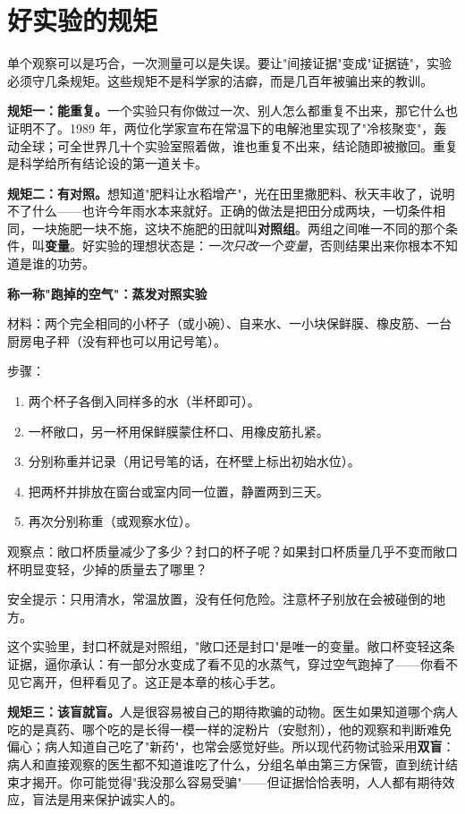 \section{好实验的规矩}

单个观察可以是巧合，一次测量可以是失误。要让"间接证据"变成"证据链"，实验必须守几条规矩。这些规矩不是科学家的洁癖，而是几百年被骗出来的教训。

\textbf{规矩一：能重复。}一个实验只有你做过一次、别人怎么都重复不出来，那它什么也证明不了。1989 年，两位化学家宣布在常温下的电解池里实现了"冷核聚变"，轰动全球；可全世界几十个实验室照着做，谁也重复不出来，结论随即被撤回。重复是科学给所有结论设的第一道关卡。

\textbf{规矩二：有对照。}想知道"肥料让水稻增产"，光在田里撒肥料、秋天丰收了，说明不了什么——也许今年雨水本来就好。正确的做法是把田分成两块，一切条件相同，一块施肥一块不施，这块不施肥的田就叫\textbf{对照组}。两组之间唯一不同的那个条件，叫\textbf{变量}。好实验的理想状态是：\emph{一次只改一个变量}，否则结果出来你根本不知道是谁的功劳。

\begin{shiyan}
\textbf{称一称"跑掉的空气"：蒸发对照实验}

材料：两个完全相同的小杯子（或小碗）、自来水、一小块保鲜膜、橡皮筋、一台厨房电子秤（没有秤也可以用记号笔）。

步骤：
\begin{enumerate}[itemsep=1pt]
\item 两个杯子各倒入同样多的水（半杯即可）。
\item 一杯敞口，另一杯用保鲜膜蒙住杯口、用橡皮筋扎紧。
\item 分别称重并记录（用记号笔的话，在杯壁上标出初始水位）。
\item 把两杯并排放在窗台或室内同一位置，静置两到三天。
\item 再次分别称重（或观察水位）。
\end{enumerate}

观察点：敞口杯质量减少了多少？封口的杯子呢？如果封口杯质量几乎不变而敞口杯明显变轻，少掉的质量去了哪里？

安全提示：只用清水，常温放置，没有任何危险。注意杯子别放在会被碰倒的地方。

这个实验里，封口杯就是对照组，"敞口还是封口"是唯一的变量。敞口杯变轻这条证据，逼你承认：有一部分水变成了看不见的水蒸气，穿过空气跑掉了——你看不见它离开，但秤看见了。这正是本章的核心手艺。
\end{shiyan}

\textbf{规矩三：该盲就盲。}人是很容易被自己的期待欺骗的动物。医生如果知道哪个病人吃的是真药、哪个吃的是长得一模一样的淀粉片（安慰剂），他的观察和判断难免偏心；病人知道自己吃了"新药"，也常会感觉好些。所以现代药物试验采用\textbf{双盲}：病人和直接观察的医生都不知道谁吃了什么，分组名单由第三方保管，直到统计结束才揭开。你可能觉得"我没那么容易受骗"——但证据恰恰表明，人人都有期待效应，盲法是用来保护诚实人的。

